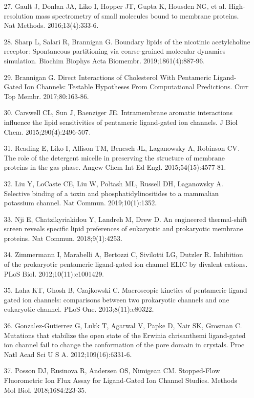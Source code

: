 27. Gault J, Donlan JA, Liko I, Hopper JT, Gupta K, Housden NG, et al.
High-resolution mass spectrometry of small molecules bound to membrane
proteins. Nat Methods. 2016;13(4):333-6.

28. Sharp L, Salari R, Brannigan G. Boundary lipids of the nicotinic
acetylcholine receptor: Spontaneous partitioning via coarse-grained
molecular dynamics simulation. Biochim Biophys Acta Biomembr.
2019;1861(4):887-96.

29. Brannigan G. Direct Interactions of Cholesterol With Pentameric
Ligand-Gated Ion Channels: Testable Hypotheses From Computational
Predictions. Curr Top Membr. 2017;80:163-86.

30. Carswell CL, Sun J, Baenziger JE. Intramembrane aromatic
interactions influence the lipid sensitivities of pentameric
ligand-gated ion channels. J Biol Chem. 2015;290(4):2496-507.

31. Reading E, Liko I, Allison TM, Benesch JL, Laganowsky A, Robinson
CV. The role of the detergent micelle in preserving the structure of
membrane proteins in the gas phase. Angew Chem Int Ed Engl.
2015;54(15):4577-81.

32. Liu Y, LoCaste CE, Liu W, Poltash ML, Russell DH, Laganowsky A.
Selective binding of a toxin and phosphatidylinositides to a mammalian
potassium channel. Nat Commun. 2019;10(1):1352.

33. Nji E, Chatzikyriakidou Y, Landreh M, Drew D. An engineered
thermal-shift screen reveals specific lipid preferences of eukaryotic
and prokaryotic membrane proteins. Nat Commun. 2018;9(1):4253.

34. Zimmermann I, Marabelli A, Bertozzi C, Sivilotti LG, Dutzler R.
Inhibition of the prokaryotic pentameric ligand-gated ion channel ELIC
by divalent cations. PLoS Biol. 2012;10(11):e1001429.

35. Laha KT, Ghosh B, Czajkowski C. Macroscopic kinetics of pentameric
ligand gated ion channels: comparisons between two prokaryotic channels
and one eukaryotic channel. PLoS One. 2013;8(11):e80322.

36. Gonzalez-Gutierrez G, Lukk T, Agarwal V, Papke D, Nair SK, Grosman
C. Mutations that stabilize the open state of the Erwinia chrisanthemi
ligand-gated ion channel fail to change the conformation of the pore
domain in crystals. Proc Natl Acad Sci U S A. 2012;109(16):6331-6.

37. Posson DJ, Rusinova R, Andersen OS, Nimigean CM. Stopped-Flow
Fluorometric Ion Flux Assay for Ligand-Gated Ion Channel Studies.
Methods Mol Biol. 2018;1684:223-35.

